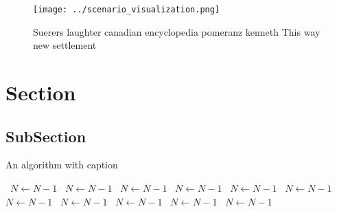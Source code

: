 \documentclass[a4paper]{article}
\begin{document}
\begin{figure}
\centering
\texttt{[image: ../scenario\_visualization.png]}
\caption{Suerers laughter canadian encyclopedia pomeranz kenneth This way new settlement
}
\end{figure}
 
\section{Section}

\subsection{SubSection}

\begin{algorithm}
\caption{An algorithm with caption}
\begin{algorithmic}
\    \State $N \gets N - 1$
\    \State $N \gets N - 1$
\    \State $N \gets N - 1$
\    \State $N \gets N - 1$
\    \State $N \gets N - 1$
\    \State $N \gets N - 1$
\    \State $N \gets N - 1$
\    \State $N \gets N - 1$
\    \State $N \gets N - 1$
\    \State $N \gets N - 1$
\    \State $N \gets N - 1$
\EndWhile
\end{algorithmic}
\end{algorithm}
\end{document}

